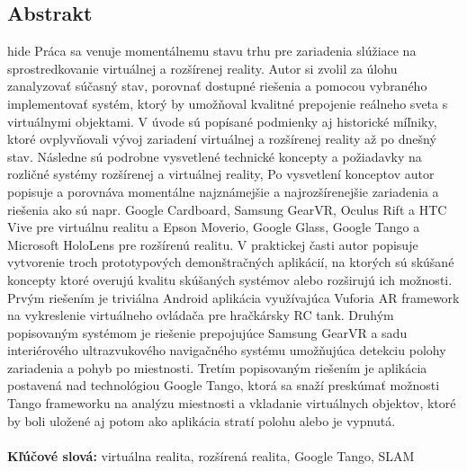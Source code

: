 \documentclass[12pt, a4paper]{article}
\begin{document}
\begin{titlepage}
\section*{Abstrakt}{hide}
Práca sa venuje momentálnemu stavu trhu pre zariadenia slúžiace na sprostredkovanie virtuálnej a rozšírenej reality. Autor si zvolil za úlohu zanalyzovať súčasný stav, porovnať dostupné riešenia a pomocou vybraného implementovať systém, ktorý by umožňoval kvalitné prepojenie reálneho sveta s virtuálnymi objektami. V úvode sú popísané podmienky aj historické míľniky, ktoré ovplyvňovali vývoj zariadení virtuálnej a rozšírenej reality až po dnešný stav. Následne sú podrobne vysvetlené technické koncepty a požiadavky na rozličné systémy rozšírenej a virtuálnej reality, Po vysvetlení konceptov autor popisuje a porovnáva momentálne najznámejšie a najrozšírenejšie zariadenia a riešenia ako sú napr. Google Cardboard, Samsung GearVR, Oculus Rift a HTC Vive pre virtuálnu realitu a Epson Moverio, Google Glass, Google Tango a Microsoft HoloLens pre rozšírenú realitu. V praktickej časti autor popisuje vytvorenie troch prototypových demonštračných aplikácií, na ktorých sú skúšané koncepty ktoré overujú kvalitu skúšaných systémov alebo rozširujú ich možnosti. Prvým riešením je triviálna Android aplikácia využívajúca Vuforia AR framework na vykreslenie virtuálneho ovládača pre hračkársky RC tank. Druhým popisovaným systémom je riešenie prepojujúce Samsung GearVR a sadu interiérového ultrazvukového navigačného systému umožňujúca detekciu polohy zariadenia a pohyb po miestnosti. Tretím popisovaným riešením je aplikácia postavená nad technológiou Google Tango, ktorá sa snaží preskúmať možnosti Tango frameworku na analýzu miestnosti a vkladanie virtuálnych objektov, ktoré by boli uložené aj potom ako aplikácia stratí polohu alebo je vypnutá.\\ \\
\textbf{Kľúčové slová:} virtuálna realita, rozšírená realita, Google Tango, SLAM
\end{titlepage}
\end{document}

